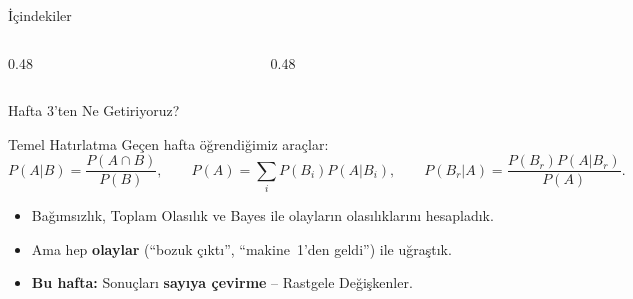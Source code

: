 \documentclass[light]{lutbeamer}
\begin{document}
\begin{frame}{İçindekiler}
  \scriptsize
  \begin{columns}[T]
    \begin{column}{0.48\textwidth}
      \tableofcontents[sections={1-3}]
    \end{column}
    \begin{column}{0.48\textwidth}
      \tableofcontents[sections={4-10}]
    \end{column}
  \end{columns}
\end{frame}




\begin{frame}{Hafta 3'ten Ne Getiriyoruz?}
    \begin{block}{Temel Hatırlatma}
        Geçen hafta öğrendiğimiz araçlar:
        \[
        P(A|B)=\frac{P(A\cap B)}{P(B)}, \qquad
        P(A)=\sum_{i}P(B_i)P(A|B_i), \qquad
        P(B_r|A)=\frac{P(B_r)P(A|B_r)}{P(A)}.
        \]
    \end{block}

    \begin{itemize}
        \item Bağımsızlık, Toplam Olasılık ve Bayes ile olayların olasılıklarını hesapladık.
        \item Ama hep \textbf{olaylar} (``bozuk çıktı'', ``makine~1'den geldi'') ile uğraştık.
        \item \textbf{Bu hafta:} Sonuçları \textbf{sayıya çevirme} -- Rastgele Değişkenler.
    \end{itemize}
\end{frame}
\end{document}
